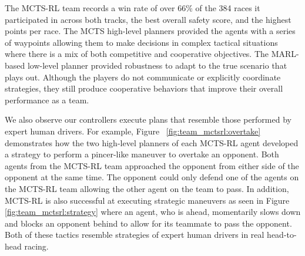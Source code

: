 \begin{enumerate}[wide, labelindent=0pt, font=\bfseries]
The MCTS-RL team records a win rate of over 66\% of the 384 races it participated in across both tracks, the best overall safety score, and the highest points per race. The MCTS high-level planners provided the agents with a series of waypoints allowing them to make decisions in complex tactical situations where there is a mix of both competitive and cooperative objectives. The MARL-based low-level planner provided robustness to adapt to the true scenario that plays out. Although the players do not communicate or explicitly coordinate strategies, they still produce cooperative behaviors that improve their overall performance as a team. 

We also observe our controllers execute plans that resemble those performed by expert human drivers. For example, Figure~ \ref{fig:team_mctsrl:overtake} demonstrates how the two high-level planners of each MCTS-RL agent developed a strategy to perform a pincer-like maneuver to overtake an opponent. Both agents from the MCTS-RL team approached the opponent from either side of the opponent at the same time. The opponent could only defend one of the agents on the MCTS-RL team allowing the other agent on the team to pass. In addition, MCTS-RL is also successful at executing strategic maneuvers as seen in Figure~ \ref{fig:team_mctsrl:strategy} where an agent, who is ahead, momentarily slows down and blocks an opponent behind to allow for its teammate to pass the opponent. Both of these tactics resemble strategies of expert human drivers in real head-to-head racing.
 \end{enumerate}
 
